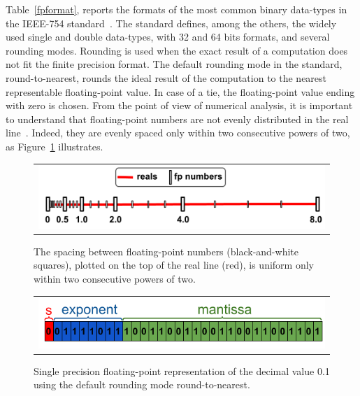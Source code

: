 %
Table~\ref{fpformat}, reports the formats of the most common binary data-types in the IEEE-754 standard~\cite{ieee754}.
%
The standard defines, among the others, the widely used single and double data-types, with 32 and 64 bits formats, and several rounding modes.
%
Rounding is used when the exact result of a computation does not fit the finite precision format.
%
The default rounding mode in the standard, round-to-nearest, rounds the ideal result of the computation to the nearest representable floating-point value.
%
In case of a tie, the floating-point value ending with zero is chosen.
%
From the point of view of numerical analysis, it is important to understand that floating-point numbers are not evenly distributed in the real line~\cite{every}.
%
%
Indeed, they are evenly spaced only within two consecutive powers of two, as Figure~\ref{fig:line} illustrates.

%
\begin{figure}[tb!]
	\centering
	\begin{tabular}{l}
		\includegraphics[width=1.0\textwidth]{pic/fpnumbers.png}
	\end{tabular}
	\caption{The spacing between floating-point numbers (black-and-white squares), plotted on the top of the real line (red), is uniform only within two consecutive powers of two.}
	\label{fig:line}
\end{figure}
%
\begin{figure}[tb!]
	\centering
	\begin{tabular}{l}
		\includegraphics[width=1.0\textwidth]{pic/examplenumber.png}
	\end{tabular}
	\caption{Single precision floating-point representation of the decimal value 0.1 using the default rounding mode round-to-nearest.}
	\label{fig:zeropointone}
\end{figure}
%


